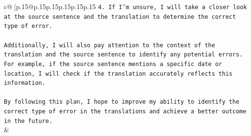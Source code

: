 \documentclass{article}
\begin{document}
{\begin{supertabular}{c@{$\;$}|p{.15\linewidth}@{}p{.15\linewidth}p{.15\linewidth}p{.15\linewidth}p{.15\linewidth}p{.15\linewidth}}
{{{\texttt{4. If I'm unsure, I will take a closer look at the source sentence and the translation to determine the correct type of error.} \\
\\ 
\texttt{Additionally, I will also pay attention to the context of the translation and the source sentence to identify any potential errors. For example, if the source sentence mentions a specific date or location, I will check if the translation accurately reflects this information.} \\
\\ 
\texttt{By following this plan, I hope to improve my ability to identify the correct type of error in the translations and achieve a better outcome in the future.} \\
            }
        }
    }
    & \\ \\

\end{supertabular}
}
\end{document}
